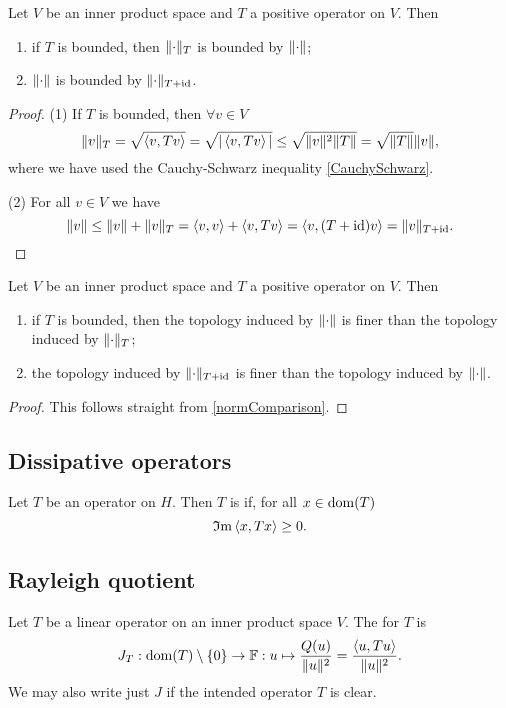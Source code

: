 \begin{proposition} \label{energyNormTopology}
Let $V$ be an inner product space and $T$ a positive operator on $V$. Then
\begin{enumerate}
\item if $T$ is bounded, then $\lVert\cdot\rVert_T$ is bounded by $\lVert\cdot\rVert$;
\item $\lVert\cdot\rVert$ is bounded by $\lVert\cdot\rVert_{T+\operatorname{id}}$.
\end{enumerate}
\end{proposition}
\begin{proof}
(1) If $T$ is bounded, then $\forall v\in V$
\[ \lVert v\rVert_T = \sqrt{\left\langle v,Tv \right\rangle} = \sqrt{|\left\langle v,Tv \right\rangle|} \leq \sqrt{\lVert v\rVert^2\lVert T\rVert} = \sqrt{\lVert T\rVert}\lVert v\rVert, \]
where we have used the Cauchy-Schwarz inequality \ref{CauchySchwarz}.

(2) For all $v\in V$ we have
\[ \lVert v\rVert \leq \lVert v\rVert + \lVert v\rVert_T = \left\langle v,v \right\rangle + \left\langle v,Tv \right\rangle = \left\langle v,(T+\operatorname{id})v \right\rangle = \lVert v\rVert_{T+\operatorname{id}}. \]
\end{proof}
\begin{corollary}
Let $V$ be an inner product space and $T$ a positive operator on $V$. Then
\begin{enumerate}
\item if $T$ is bounded, then the topology induced by $\lVert\cdot\rVert$ is finer than the topology induced by $\lVert\cdot\rVert_T$;
\item the topology induced by $\lVert\cdot\rVert_{T+\operatorname{id}}$ is finer than the topology induced by $\lVert\cdot\rVert$.
\end{enumerate}
\end{corollary}
\begin{proof}
This follows straight from \ref{normComparison}.
\end{proof}

\subsection{Dissipative operators}
\begin{definition}
Let $T$ be an operator on $H$. Then $T$ is  if, for all $x\in\operatorname{dom}(T)$
\[ \operatorname{\mathfrak{I}m} \left\langle x,Tx \right\rangle \geq 0. \]
\end{definition}

\subsection{Rayleigh quotient}
\begin{definition}
Let $T$ be a linear operator on an inner product space $V$. The  for $T$ is 
\[ J_T: \operatorname{dom}(T)\setminus\{0\}\to \mathbb{F}: u\mapsto \frac{Q(u)}{\lVert u\rVert^2} = \frac{\left\langle u,Tu \right\rangle}{\lVert u\rVert^2}. \]
We may also write just $J$ if the intended operator $T$ is clear.
\end{definition}

